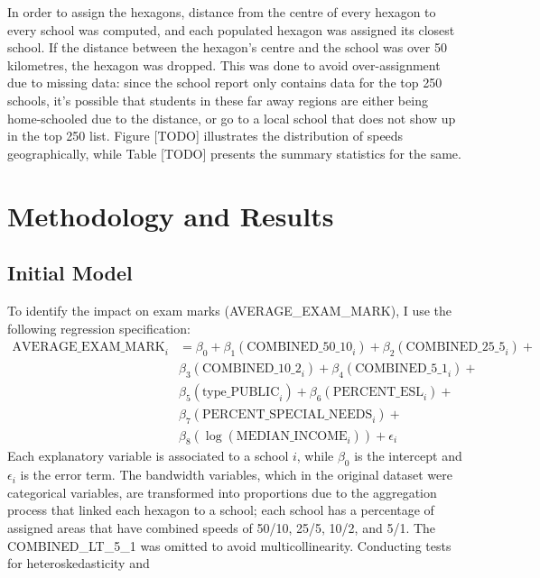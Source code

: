\documentclass[stu, floatsintext]{apa7}
\begin{document}
    In order to assign the hexagons, distance from the centre of every hexagon to every school was computed, and each populated hexagon was assigned its closest school. If the distance between the hexagon's centre and the school was over 50 kilometres, the hexagon was dropped. This was done to avoid over-assignment due to missing data: since the school report only contains data for the top 250 schools, it's possible that students in these far away regions are either being home-schooled due to the distance, or go to a local school that does not show up in the top 250 list. Figure [TODO] illustrates the distribution of speeds geographically, while Table [TODO] presents the summary statistics for the same. \\
    \section{Methodology and Results}
    \subsection{Initial Model}
    To identify the impact on exam marks (AVERAGE\_EXAM\_MARK), I use the following regression specification:
    \begin{align*}
        \text{AVERAGE\_EXAM\_MARK}_i &= \beta_0 + \beta_1(\text{COMBINED\_50\_10}_i) + \beta_2(\text{COMBINED\_25\_5}_i) + \\
        & \beta_3(\text{COMBINED\_10\_2}_i) + \beta_4(\text{COMBINED\_5\_1}_i) + \\
        & \beta_5(\text{type\_PUBLIC}_i) + \beta_6(\text{PERCENT\_ESL}_i) + \\
        & \beta_7(\text{PERCENT\_SPECIAL\_NEEDS}_i) + \\
        & \beta_8(\log(\text{MEDIAN\_INCOME}_i)) + \epsilon_i
    \end{align*}
    Each explanatory variable is associated to a school $i$, while $\beta_0$ is the intercept and $\epsilon_i$ is the error term. The bandwidth variables, which in the original dataset were categorical variables, are transformed into proportions due to the aggregation process that linked each hexagon to a school; each school has a percentage of assigned areas that have combined speeds of 50/10, 25/5, 10/2, and 5/1. The COMBINED\_LT\_5\_1 was omitted to avoid multicollinearity. Conducting tests for heteroskedasticity and 
    \clearpage
    \printbibliography
\end{document}
